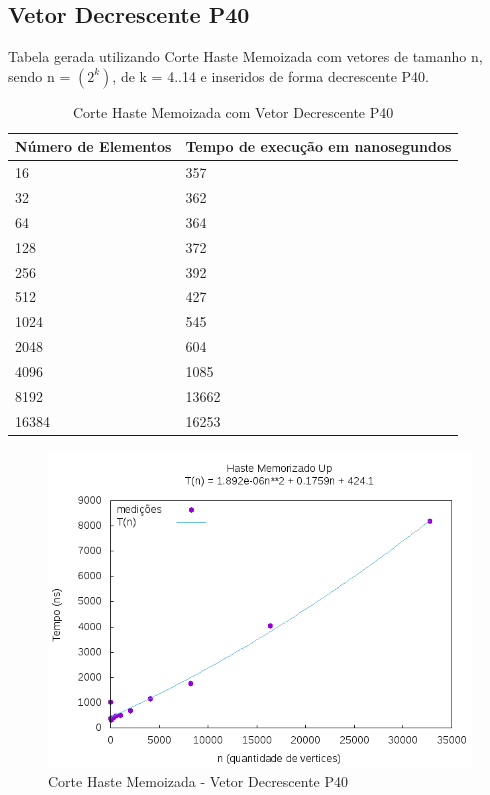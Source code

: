 \documentclass[12pt,a4paper,twoside]{report}
\begin{document}
\subsection{Vetor Decrescente P40}
Tabela gerada utilizando Corte Haste Memoizada com vetores de tamanho n, sendo n = $(2^k)$, de k = 4..14 e inseridos de forma decrescente P40.
\begin{table}[H]
\centering
\caption{Corte Haste Memoizada com Vetor Decrescente P40}
\label{my-label}
\begin{tabular}{|l|l|}
\hline
\multicolumn{1}{|c|}{\textbf{Número de Elementos}} & \multicolumn{1}{c|}{\textbf{Tempo de execução em nanosegundos}} \\ \hline
16 & 357 \\ \hline
32 & 362 \\ \hline
64 & 364 \\ \hline
128 & 372 \\ \hline
256 & 392 \\ \hline
512 & 427 \\ \hline
1024 & 545 \\ \hline
2048 & 604 \\ \hline
4096 & 1085 \\ \hline
8192 & 13662 \\ \hline
16384 & 16253 \\ \hline

\end{tabular}
\end{table}

\begin{figure}[H]
    \centering
    \includegraphics[width=0.7\linewidth]{graficos/CorteHasteMemorizado/Decrescente P40/HasteMemo.png}
  \caption{Corte Haste Memoizada - Vetor Decrescente P40}
\end{figure}
\end{document}
